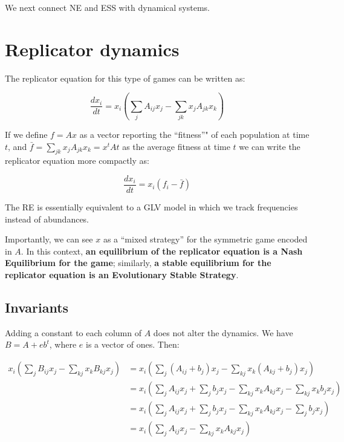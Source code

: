 \documentclass[
]{book}
\begin{document}
We next connect NE and ESS with dynamical systems.

\hypertarget{replicator-dynamics}{%
\section{Replicator dynamics}\label{replicator-dynamics}}

The replicator equation for this type of games can be written as:

\[
\dfrac{d x_i}{dt} = x_i \left( \sum_j A_{ij} x_j - \sum_{jk} x_j A_{jk} x_k \right)
\]

If we define \(f = A x\) as a vector reporting the ``fitness''" of each population at time \(t\), and \(\bar{f} = \sum_{jk} x_j A_{jk} x_k = x^t A t\) as the average fitness at time \(t\) we can write the replicator equation more compactly as:

\[
\dfrac{d x_i}{dt} = x_i (f_i - \bar{f})
\]

The RE is essentially equivalent to a GLV model in which we track frequencies instead of abundances.

Importantly, we can see \(x\) as a ``mixed strategy'' for the symmetric game encoded in \(A\). In this context, \textbf{an equilibrium of the replicator equation is a Nash Equilibrium for the game}; similarly, \textbf{a stable equilibrium for the replicator equation is an Evolutionary Stable Strategy}.

\hypertarget{invariants}{%
\subsection{Invariants}\label{invariants}}

Adding a constant to each column of \(A\) does not alter the dynamics. We have \(B = A + e b^t\), where \(e\) is a vector of ones. Then:

\[
\begin{aligned}
x_i \left( \sum_j B_{ij} x_j - \sum_{kj} x_k B_{kj} x_j \right) & = x_i \left( \sum_j (A_{ij} + b_j) x_j - \sum_{kj} x_k (A_{kj} + b_j) x_j \right)\\
&= x_i \left(\sum_j A_{ij} x_j + \sum_j b_j x_j  - \sum_{kj} x_k A_{kj} x_j - \sum_{kj} x_k b_{j} x_j \right)\\
&= x_i \left(\sum_j A_{ij} x_j + \sum_j b_j x_j  - \sum_{kj} x_k A_{kj} x_j - \sum_{j} b_{j} x_j \right)\\
&= x_i \left(\sum_j A_{ij} x_j - \sum_{kj} x_k A_{kj} x_j \right)\\
\end{aligned}
\]
\end{document}
